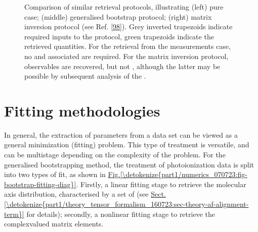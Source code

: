 \documentclass[letterpaper,table,10pt,english]{jupyterBook}
\begin{document}
\begin{figure}[htbp]
\centering
\capstart

\noindent{}
\caption{Comparison of similar {\hyperref[\detokenize{backmatter/glossary:term-radial-matrix-elements}]{}} retrieval protocols, illustrating (left) pure {\hyperref[\detokenize{backmatter/glossary:term-MF}]{}} case; (middle) generalised bootstrap protocol; (right) matrix inversion protocol (see Ref. {[}\hyperlink{cite.backmatter/bibliography:id635}{98}{]}).  Grey inverted trapezoids indicate required inputs to the protocol, green trapezoids indicate the retrieved quantities. For the retrieval from the {\hyperref[\detokenize{backmatter/glossary:term-MF}]{}} measurements case, no {\hyperref[\detokenize{backmatter/glossary:term-RWP}]{}} and associated {\hyperref[\detokenize{backmatter/glossary:term-ADMs}]{}} are required. For the matrix inversion protocol, {\hyperref[\detokenize{backmatter/glossary:term-MF}]{}} observables are recovered, but not {\hyperref[\detokenize{backmatter/glossary:term-radial-matrix-elements}]{}}, although the latter may be possible by subsequent analysis of the {\hyperref[\detokenize{backmatter/glossary:term-MF}]{}}.}\label{\detokenize{part1/numerics_070723:fig-general-fitting-diag}}\end{figure}


\section{Fitting methodologies}
\label{\detokenize{part1/numerics_070723:fitting-methodologies}}\label{\detokenize{part1/numerics_070723:sec-numerics-fitting-methodologies}}
\sphinxAtStartPar
In general, the extraction of parameters from a data set can be viewed as a general minimization (fitting) problem. This type of treatment is versatile, and can be multi\sphinxhyphen{}stage depending on the complexity of the problem. For the generalised bootstrapping method, the treatment of photoionization data is split into two types of fit, as shown in \hyperref[\detokenize{part1/numerics_070723:fig-bootstrap-fitting-diag}]{Fig.\@ \ref{\detokenize{part1/numerics_070723:fig-bootstrap-fitting-diag}}}. Firstly, a linear fitting stage to retrieve the molecular axis distribution, characterised by a set of {\hyperref[\detokenize{backmatter/glossary:term-ADMs}]{}} (see \hyperref[\detokenize{part1/theory_tensor_formalism_160723:sec-theory-af-alignment-term}]{Sect.\@ \ref{\detokenize{part1/theory_tensor_formalism_160723:sec-theory-af-alignment-term}}} for details); secondly, a non\sphinxhyphen{}linear fitting stage to retrieve the complex\sphinxhyphen{}valued matrix elements.
\end{document}
